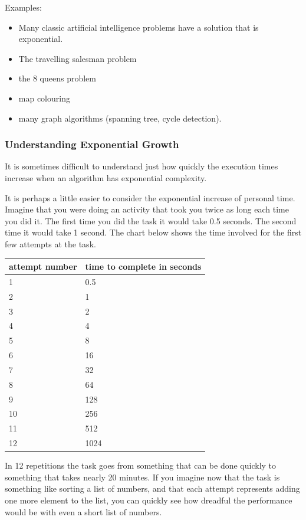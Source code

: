 Examples:
\begin{itemize}

\item Many classic artificial intelligence problems have a solution that is
  exponential.
\item  The travelling salesman problem
\item the 8 queens problem
\item map colouring
\item  many graph algorithms (spanning tree, cycle detection).
\end{itemize}

\subsubsection {Understanding Exponential Growth}
 It is sometimes difficult to understand just how quickly the execution times increase when an algorithm has exponential complexity.  
 
 It is perhaps a little easier to consider the exponential increase of personal time.  Imagine that you were doing an activity that took you twice as long each time you did it.    The first time you did the task it would take  0.5 seconds.  The second time it would take 1 second.   The chart below shows the time involved for the first few attempts at the task.
 
\begin{tabular}{l|l}
attempt number & time to complete  in seconds\\ \hline
1 & 0.5 \\
2 & 1 \\
3 & 2 \\
4 & 4 \\
5 & 8 \\
6 & 16 \\
7 & 32 \\
8 & 64 \\
9 & 128 \\
10 & 256 \\
11 & 512 \\
12 & 1024\\ \hline
\end{tabular}

In 12 repetitions the task goes from something that can be done quickly to something that takes nearly 20 minutes.    If you imagine now that the task is something like sorting a list of numbers,  and that each attempt represents adding one more element to the list,  you can quickly see how dreadful the performance would be with even a short list of numbers.

